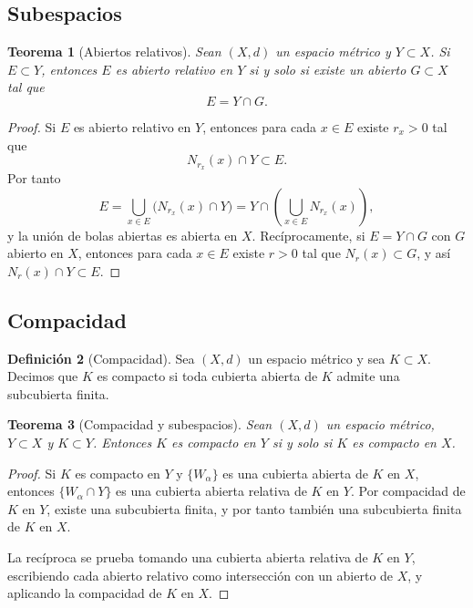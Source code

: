 \documentclass[12pt]{article}
\theoremstyle{definition}
\newtheorem{definition}{Definición}[section]
\theoremstyle{plain}
\newtheorem{theorem}[definition]{Teorema}
\theoremstyle{remark}
\begin{document}
\subsection*{Subespacios}

\begin{theorem}[Abiertos relativos]
Sean $(X,d)$ un espacio métrico y $Y\subset X$. Si $E\subset Y$, entonces $E$ es abierto relativo en $Y$ si y solo si existe un abierto $G\subset X$ tal que
\[
E=Y\cap G.
\]
\end{theorem}

\begin{proof}
Si $E$ es abierto relativo en $Y$, entonces para cada $x\in E$ existe $r_x>0$ tal que
\[
N_{r_x}(x)\cap Y\subset E.
\]
Por tanto
\[
E=\bigcup_{x\in E}\bigl(N_{r_x}(x)\cap Y\bigr)
=Y\cap\left(\bigcup_{x\in E}N_{r_x}(x)\right),
\]
y la unión de bolas abiertas es abierta en $X$.
Recíprocamente, si $E=Y\cap G$ con $G$ abierto en $X$, entonces para cada $x\in E$ existe $r>0$ tal que $N_r(x)\subset G$, y así $N_r(x)\cap Y\subset E$.
\end{proof}

\subsection*{Compacidad}

\begin{definition}[Compacidad]
Sea $(X,d)$ un espacio métrico y sea $K\subset X$.
Decimos que $K$ es compacto si toda cubierta abierta de $K$ admite una subcubierta finita.
\end{definition}

\begin{theorem}[Compacidad y subespacios]
Sean $(X,d)$ un espacio métrico, $Y\subset X$ y $K\subset Y$.
Entonces $K$ es compacto en $Y$ si y solo si $K$ es compacto en $X$.
\end{theorem}

\begin{proof}
Si $K$ es compacto en $Y$ y $\{W_\alpha\}$ es una cubierta abierta de $K$ en $X$, entonces $\{W_\alpha\cap Y\}$ es una cubierta abierta relativa de $K$ en $Y$.
Por compacidad de $K$ en $Y$, existe una subcubierta finita, y por tanto también una subcubierta finita de $K$ en $X$.

La recíproca se prueba tomando una cubierta abierta relativa de $K$ en $Y$, escribiendo cada abierto relativo como intersección con un abierto de $X$, y aplicando la compacidad de $K$ en $X$.
\end{proof}
\end{document}
